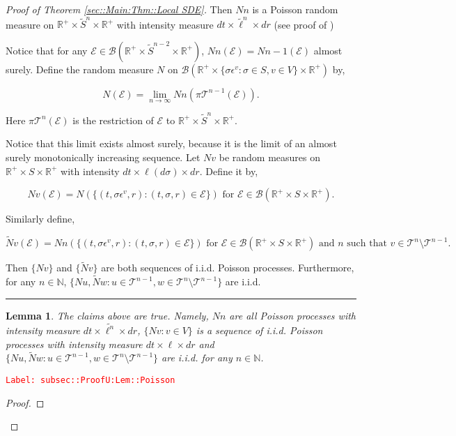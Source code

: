 \documentclass[12pt]{article}
\newcommand{\mb}{\mathbb}
\newcommand{\mc}{\mathcal}
\newcommand{\ms}{\mathscr}
\newcommand{\ra}{\rightarrow}
\newcommand{\te}{\text}
\newcommand{\ep}{\epsilon}
\newcommand{\tr}{\textcolor{red}}
\newcommand{\labe}[1]{\tr{\texttt{Label: #1}}}
\newcommand{\ind}{\hspace{24pt}}
\newcommand{\lin}{\rule{\linewidth}{0.4 pt}}
\renewcommand{\v}{v}							%
\newcommand{\vv}{u}								%
\newcommand{\vvv}{w}							%
\renewcommand{\S}{S}							%
\newcommand{\s}{\sigma}							%
\newcommand{\ev}{\ep}							%
\renewcommand{\t}{t}							%
\newcommand{\proj}{\pi}							%
\newcommand{\vind}[1]{^{#1}}					%
\newcommand{\tree}{\mc{T}}						%
\newcommand{\sln}[1]{^{#1}}						%
\newcommand{\poiss}{N}							%
\newcommand{\Sm}{\ell}							%
\renewcommand{\r}{r}							%
\newcommand{\alt}[1]{\widetilde{#1}}			%
\newcommand{\evnt}{\mc{E}}						%
\newtheorem{lem}[thms]{Lemma}
\begin{document}
\begin{proof}[Proof of Theorem \ref{sec::Main:Thm::Local SDE}]
Then \(\poiss{n}\) is a Poisson random measure on \(\mb{R}^+\times\alt{\S}^n\times \mb{R}^+\) with intensity measure \(d\t\times \alt{\Sm}^n\times d\r\) (see proof of \cite[Theorem 14.7.1(b)]{DalVer08})

\ind Notice that for any \(\evnt{} \in \ms{B}(\mb{R}^+\times \alt{\S}^{n-2}\times \mb{R}^+)\), \(\poiss{n}(\evnt{}) = \poiss{n-1}(\evnt{})\) almost surely. Define the random measure \(\poiss{}\) on \(\ms{B}(\mb{R}^+\times \{\s\ev\vind{\v}:\s\in \S,\v \in V\}\times \mb{R}^+)\) by,

\[\poiss{}(\evnt{}) = \lim_{n \ra\infty}\poiss{n}\left(\proj{\tree\sln{n-1}}{}(\evnt{})\right).\]

Here \(\proj{\tree\sln{n}}{}(\evnt{})\) is the restriction of \(\evnt{}\) to \(\mb{R}^+\times \alt{\S}^n\times\mb{R}^+\). 

\ind Notice that this limit exists almost surely, because it is the limit of an almost surely monotonically increasing sequence. Let \(\poiss{\v}\) be random measures on \(\mb{R}^+\times\S\times\mb{R}^+\) with intensity \(d\t\times\Sm(d\s)\times d\r\). Define it by,

\[\poiss{\v}(\evnt{}) = \poiss{}\left(\{(\t,\s\ev\vind{\v},\r):(\t,\s,\r)\in \evnt{}\}\right) \te{ for } \evnt{} \in \ms{B}(\mb{R}^+\times\S\times\mb{R}^+).\]

Similarly define,

\[\alt{\poiss}{\v}(\evnt{}) = \poiss{n}\left(\{(\t,\s\ev\vind{\v},\r):(\t,\s,\r)\in \evnt{}\}\right)\te{ for } \evnt{} \in \ms{B}(\mb{R}^+\times\S\times\mb{R}^+)\te{ and }n\te{ such that } \v\in \tree\sln{n}\setminus\tree\sln{n-1}.\]

Then \(\{\poiss{\v}\}\) and \(\{\alt{\poiss}{\v}\}\) are both sequences of i.i.d. Poisson processes. Furthermore, for any \(n \in \mb{N}\), \(\{\poiss{\vv},\alt{\poiss}{\vvv}:\vv\in \tree\sln{n-1},\vvv\in\tree\sln{n}\setminus\tree\sln{n-1}\}\) are i.i.d.

\lin

\begin{lem}
The claims above are true. Namely, \(\poiss{n}\) are all Poisson processes with intensity measure \(d\t\times\alt{\Sm^{n}}\times d\r\), \(\{\poiss{\v}:\v\in V\}\) is a sequence of i.i.d. Poisson processes with intensity measure \(d\t\times\Sm\times d\r\) and \(\{\poiss{\vv},\alt{\poiss}{\vvv}:\vv\in \tree\sln{n-1},\vvv\in\tree\sln{n}\setminus\tree\sln{n-1}\}\) are i.i.d. for any \(n \in \mb{N}\).

\label{subsec::ProofU:Lem::Poisson}
\end{lem}
\labe{subsec::ProofU:Lem::Poisson}
\begin{proof}


\end{proof}
\end{proof}
\end{document}

